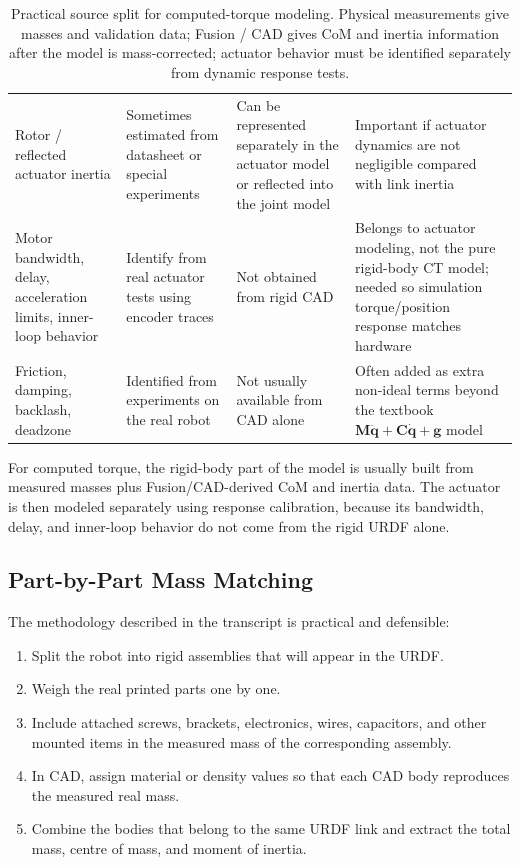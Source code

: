 \documentclass[11pt,a4paper]{article}
\newcommand{\bq}{\bm{q}}
\newcommand{\bM}{\bm{M}}
\newcommand{\bC}{\bm{C}}
\newcommand{\bG}{\bm{g}}
\begin{document}
\begin{table}[H]
\begin{tabularx}{\linewidth}{p{3.0cm} p{3.2cm} p{3.2cm} X}
Rotor / reflected actuator inertia & Sometimes estimated from datasheet or special experiments & Can be represented separately in the actuator model or reflected into the joint model & Important if actuator dynamics are not negligible compared with link inertia \\

Motor bandwidth, delay, acceleration limits, inner-loop behavior & Identify from real actuator tests using encoder traces & Not obtained from rigid CAD & Belongs to actuator modeling, not the pure rigid-body CT model; needed so simulation torque/position response matches hardware \\

Friction, damping, backlash, deadzone & Identified from experiments on the real robot & Not usually available from CAD alone & Often added as extra non-ideal terms beyond the textbook $\bM\ddot{\bq}+\bC\dot{\bq}+\bG$ model \\
\bottomrule
\end{tabularx}
\caption{Practical source split for computed-torque modeling.  Physical measurements give masses and validation data; Fusion / CAD gives CoM and inertia information after the model is mass-corrected; actuator behavior must be identified separately from dynamic response tests.}
\label{tab:physical_vs_fusion_vs_actuator}
\end{table}

\begin{resultbox}
For computed torque, the rigid-body part of the model is usually built from
measured masses plus Fusion/CAD-derived CoM and inertia data.  The actuator is
then modeled separately using response calibration, because its bandwidth,
delay, and inner-loop behavior do not come from the rigid URDF alone.
\end{resultbox}

\subsection{Part-by-Part Mass Matching}

The methodology described in the transcript is practical and defensible:
\begin{enumerate}[leftmargin=2em]
  \item Split the robot into rigid assemblies that will appear in the URDF.
  \item Weigh the real printed parts one by one.
  \item Include attached screws, brackets, electronics, wires, capacitors, and other mounted items in the measured mass of the corresponding assembly.
  \item In CAD, assign material or density values so that each CAD body reproduces the measured real mass.
  \item Combine the bodies that belong to the same URDF link and extract the total mass, centre of mass, and moment of inertia.
\end{enumerate}
\end{document}
